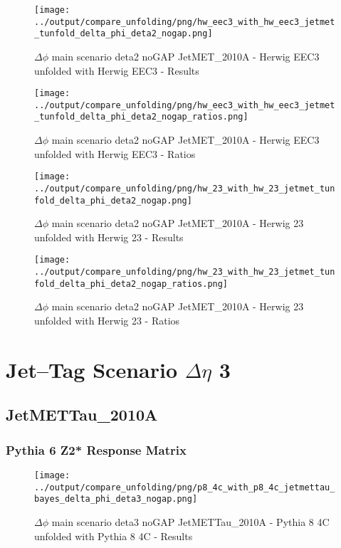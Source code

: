 \documentclass[11pt]{book}
\begin{document}
\begin{figure}[ht]
\centering
\texttt{[image: ../output/compare\_unfolding/png/hw\_eec3\_with\_hw\_eec3\_jetmet\_tunfold\_delta\_phi\_deta2\_nogap.png]}
\caption{$\Delta\phi$ main scenario deta2 noGAP JetMET\_2010A - Herwig EEC3 unfolded with Herwig EEC3 - Results}
\label{hw_eec3_hw_eec3_jetmet_tunfold_delta_phi_deta2_nogap_a}
\end{figure}

\begin{figure}[ht]
\centering
\texttt{[image: ../output/compare\_unfolding/png/hw\_eec3\_with\_hw\_eec3\_jetmet\_tunfold\_delta\_phi\_deta2\_nogap\_ratios.png]}
\caption{$\Delta\phi$ main scenario deta2 noGAP JetMET\_2010A - Herwig EEC3 unfolded with Herwig EEC3 - Ratios}
\label{hw_eec3_hw_eec3_jetmet_tunfold_delta_phi_deta2_nogap_b}
\end{figure}

\begin{figure}[ht]
\centering
\texttt{[image: ../output/compare\_unfolding/png/hw\_23\_with\_hw\_23\_jetmet\_tunfold\_delta\_phi\_deta2\_nogap.png]}
\caption{$\Delta\phi$ main scenario deta2 noGAP JetMET\_2010A - Herwig 23 unfolded with Herwig 23 - Results}
\label{hw_23_hw_23_jetmet_tunfold_delta_phi_deta2_nogap_a}
\end{figure}

\begin{figure}[ht]
\centering
\texttt{[image: ../output/compare\_unfolding/png/hw\_23\_with\_hw\_23\_jetmet\_tunfold\_delta\_phi\_deta2\_nogap\_ratios.png]}
\caption{$\Delta\phi$ main scenario deta2 noGAP JetMET\_2010A - Herwig 23 unfolded with Herwig 23 - Ratios}
\label{hw_23_hw_23_jetmet_tunfold_delta_phi_deta2_nogap_b}
\end{figure}




\newpage
\chapter{Jet--Tag Scenario $\Delta\eta$ 3}
\section{JetMETTau\_2010A}
\subsection{Pythia 6 Z2* Response Matrix}



\begin{figure}[ht]
\centering
\texttt{[image: ../output/compare\_unfolding/png/p8\_4c\_with\_p8\_4c\_jetmettau\_bayes\_delta\_phi\_deta3\_nogap.png]}
\caption{$\Delta\phi$ main scenario deta3 noGAP JetMETTau\_2010A - Pythia 8 4C unfolded with Pythia 8 4C - Results}
\label{p8_p8_jetmettau_bayes_delta_phi_deta3_nogap_a}
\end{figure}
\end{document}
